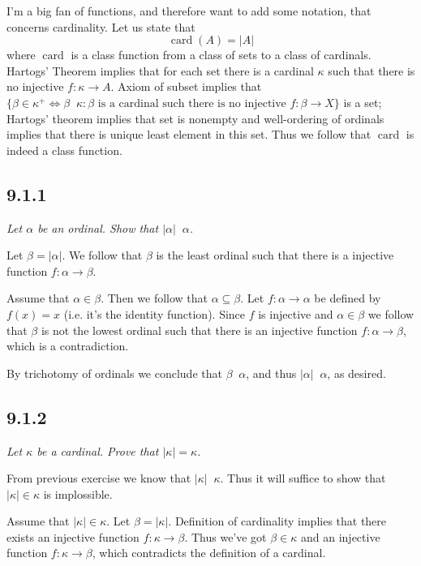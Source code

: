 \documentclass[11pt,oneside,titlepage]{book}
\DeclareMathOperator \lra {\Leftrightarrow}
\DeclareMathOperator \card {card}
\DeclareMathOperator \ineq {\underline{\in}}
\newcommand{\set}[1]{\{ #1 \}}
\begin{document}
I'm a big fan of functions, and therefore want to add some notation, that concerns cardinality.
Let us state that 
$$\card(A) = |A|$$
where $\card$ is a class function from a class of sets to a class of cardinals.
Hartogs' Theorem implies that for each set there is a cardinal $\kappa$ such that there
is no injective $f: \kappa \to A$.
Axiom of subset implies that $\set{\beta \in \kappa^+ \lra \beta \ineq \kappa:
  \beta \text{ is a cardinal such there is no injective } f: \beta \to X}$ is a
set; Hartogs' theorem implies that set is nonempty and well-ordering of ordinals implies that
there is unique least element in this set. Thus we follow that $\card$ is indeed a class function.

\subsection*{9.1.1}

\textit{Let $\alpha$ be an ordinal. Show that $|\alpha| \ineq \alpha$.}

Let $\beta = |\alpha|$. We follow that $\beta$ is the least ordinal such that there
is a injective function $f: \alpha \to \beta$. 

Assume that $\alpha \in \beta$. Then we follow that $\alpha \subseteq \beta$.
Let $f: \alpha \to \alpha$ be defined by $f(x) = x$ (i.e. it's the identity function).
Since $f$ is injective and $\alpha \in \beta$ we follow that $\beta$ is not the lowest
ordinal such that there is an injective function $f: \alpha \to \beta$, which is a contradiction.

By trichotomy of ordinals we conclude that $\beta \ineq \alpha$,
and thus $|\alpha| \ineq \alpha$, as desired.

\subsection*{9.1.2}

\textit{Let $\kappa$ be a cardinal. Prove that $|\kappa| = \kappa$.}

From previous exercise we know that $|\kappa| \ineq \kappa$. Thus it will suffice to show that
$|\kappa| \in \kappa$ is implossible.

Assume that $|\kappa| \in \kappa$. Let $\beta = |\kappa|$. Definition of cardinality
implies that there exists an injective function $f: \kappa \to \beta$. Thus
we've got $\beta \in \kappa$ and an injective function $f: \kappa \to \beta$,
which contradicts the definition of a cardinal.
\end{document}
